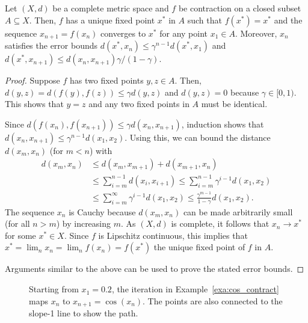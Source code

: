 \begin{theorem}
Let $(X,d)$ be a complete metric space and $f$ be contraction on a closed subset $A \subseteq X$.
Then, $f$ has a unique fixed point $x^*$ in $A$ such that $f(x^*) = x^*$ and the sequence $x_{n+1} = f(x_n)$ converges to $x^*$ for any point $x_1 \in A$.  Moreover, $x_n$ satisfies the error bounds $d(x^*,x_n) \leq \gamma^{n-1} d(x^*,x_1)$ and $d(x^*,x_{n+1}) \leq d(x_n,x_{n+1})\gamma /(1-\gamma)$.
\end{theorem}
\begin{proof}
Suppose $f$ has two fixed points $y,z\in A$.
Then, $d(y,z) = d \left(f(y),f(z) \right) \leq \gamma  d(y,z)$ and $d(y,z) = 0$ because $\gamma \in [0,1)$.
This shows that $y=z$ and any two fixed points in $A$ must be identical.

Since $d(f(x_n),f(x_{n+1})) \leq \gamma d(x_n,x_{n+1})$, induction shows that $d(x_n,x_{n+1}) \leq \gamma^{n-1} d(x_1,x_2)$.
Using this, we can bound the distance $d(x_m,x_n)$ (for $m<n$) with
\begin{align*}
d(x_m,x_n)
& \leq d(x_m,x_{m+1}) + d(x_{m+1},x_n) \\
& \leq \sum_{i=m}^{n-1} d(x_i,x_{i+1}) 
 \leq \sum_{i=m}^{n-1} \gamma^{i-1} d(x_1,x_2) \\
& \leq \sum_{i=m}^\infty \gamma^{i-1} d(x_1,x_2) 
 \leq \frac{\gamma^{m-1}}{1-\gamma} d(x_1,x_2).
\end{align*}
The sequence $x_n$ is Cauchy because $d(x_m,x_n)$ can be made arbitrarily small (for all $n>m$) by increasing $m$.
As $(X,d)$ is complete, it follows that $x_n \to x^*$ for some $x^* \in X$.
Since $f$ is Lipschitz continuous, this implies that $x^* = \lim_n x_n = \lim_n f(x_n) = f(x^*)$ the unique fixed point of $f$ in $A$.

Arguments similar to the above can be used to prove the stated error bounds.
\end{proof}

\begin{figure}[t]
\centering

\vspace{-5mm}
\caption{\label{fig:cos_contract}Starting from $x_1 = 0.2$, the iteration in Example~\ref{exa:cos_contract} maps $x_n$ to $x_{n+1}= \cos(x_n)$.  The points are also connected to the slope-1 line to show the path.}
\end{figure}

